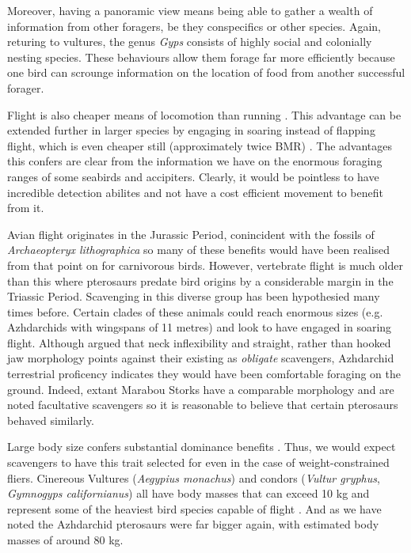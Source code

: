 \documentclass[a4paper,12pt]{article}
\begin{document}
Moreover, having a panoramic view means being able to gather a wealth of information from other foragers, be they conspecifics or other species. Again, returing to vultures, the genus \textit{Gyps} consists of highly social and colonially nesting species. These behaviours allow them forage far more efficiently because one bird can scrounge information on the location of food from another successful forager. 

Flight is also cheaper means of locomotion than running \citep{tucker1975energetic}. This advantage can be extended further in larger species by engaging in soaring instead of flapping flight, which is even cheaper still (approximately twice BMR) \citep{hedenstrom1993migration}. The advantages this confers are clear from the information we have on the enormous foraging ranges of some seabirds and accipiters. Clearly, it would be pointless to have incredible detection abilites and not have a cost efficient movement to benefit from it. 

Avian flight originates in the Jurassic Period, conincident with the fossils of \textit{Archaeopteryx lithographica} so many of these benefits would have been realised from that point on for carnivorous birds. However, vertebrate flight is much older than this where pterosaurs predate bird origins by a considerable margin in the Triassic Period. Scavenging in this diverse group has been hypothesied many times before. Certain clades of these animals could reach enormous sizes (e.g. Azhdarchids with wingspans of 11 metres) and look to have engaged in soaring flight.  Although \cite{witton2008reappraisal} argued that neck inflexibility and straight, rather than hooked jaw morphology points against their existing as \textit{obligate} scavengers, Azhdarchid terrestrial proficency indicates they would have been comfortable foraging on the ground. Indeed, extant Marabou Storks have a comparable morphology and are noted facultative scavengers so it is reasonable to believe that certain pterosaurs behaved similarly.   

Large body size confers substantial dominance benefits \citep{ruxton2004obligate}. Thus, we would expect scavengers to have this trait selected for even in the case of weight-constrained fliers. Cinereous Vultures (\textit{Aegypius monachus}) and condors (\textit{Vultur gryphus}, \textit{Gymnogyps californianus}) all have body masses that can exceed 10 kg and represent some of the heaviest bird species capable of flight \citep{ferguson2001raptors,donazar2002effects}. And as we have noted the Azhdarchid pterosaurs were far bigger again, with estimated body masses of around 80 kg. 
 
\end{document}
